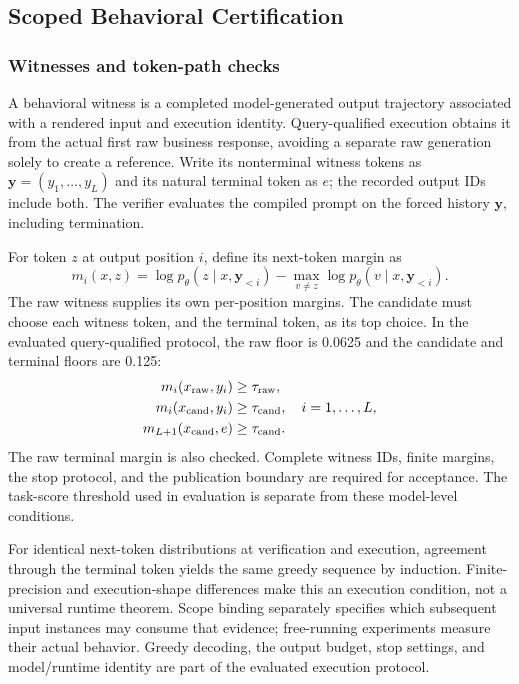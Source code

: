 \subsection{Scoped Behavioral Certification}
\label{sec:scope}
\subsubsection{Witnesses and token-path checks}
A behavioral witness is a completed model-generated output trajectory associated with a rendered input and execution identity. Query-qualified execution obtains it from the actual first raw business response, avoiding a separate raw generation solely to create a reference. Write its nonterminal witness tokens as $\mathbf y=(y_1,\ldots,y_L)$ and its natural terminal token as $e$; the recorded output IDs include both. The verifier evaluates the compiled prompt on the forced history $\mathbf y$, including termination.

For token $z$ at output position $i$, define its next-token margin as
\begin{equation}
 m_i(x,z)=\log p_\theta(z\mid x,\mathbf y_{<i})-
 \max_{v\ne z}\log p_\theta(v\mid x,\mathbf y_{<i}).
\label{eq:margin}
\end{equation}
The raw witness supplies its own per-position margins. The candidate must choose each witness token, and the terminal token, as its top choice. In the evaluated query-qualified protocol, the raw floor is 0.0625 and the candidate and terminal floors are 0.125:
\begin{equation}
\begin{aligned}
 m_i(x_{\mathrm{raw}},y_i)&\geq\tau_{\mathrm{raw}},\\
 m_i(x_{\mathrm{cand}},y_i)&\geq\tau_{\mathrm{cand}},\quad i=1,\ldots,L,\\
 m_{L+1}(x_{\mathrm{cand}},e)&\geq\tau_{\mathrm{cand}}.
\end{aligned}
\label{eq:agreement}
\end{equation}
The raw terminal margin is also checked. Complete witness IDs, finite margins, the stop protocol, and the publication boundary are required for acceptance. The task-score threshold used in evaluation is separate from these model-level conditions.

For identical next-token distributions at verification and execution, agreement through the terminal token yields the same greedy sequence by induction. Finite-precision and execution-shape differences make this an execution condition, not a universal runtime theorem. Scope binding separately specifies which subsequent input instances may consume that evidence; free-running experiments measure their actual behavior. Greedy decoding, the output budget, stop settings, and model/runtime identity are part of the evaluated execution protocol.

